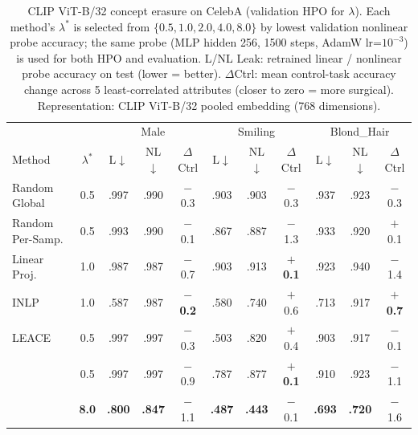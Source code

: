 \begin{table}[t]
\centering
\caption{CLIP ViT-B/32 concept erasure on CelebA (validation HPO for $\lambda$). Each method's $\lambda^*$ is selected from $\{0.5, 1.0, 2.0, 4.0, 8.0\}$ by lowest validation nonlinear probe accuracy; the same probe (MLP hidden 256, 1500 steps, AdamW lr=$10^{-3}$) is used for both HPO and evaluation. L/NL Leak: retrained linear / nonlinear probe accuracy on test (lower = better). $\Delta$Ctrl: mean control-task accuracy change across 5 least-correlated attributes (closer to zero = more surgical). Representation: CLIP ViT-B/32 pooled embedding (768 dimensions).}
\label{tab:celeba_clip_fair}
\small
\setlength{\tabcolsep}{3.5pt}
\begin{tabular}{l c|ccc|ccc|ccc}
\toprule
 & & \multicolumn{3}{c|}{Male} & \multicolumn{3}{c|}{Smiling} & \multicolumn{3}{c}{Blond\_Hair} \\
Method & $\lambda^*$ & L$\downarrow$ & NL$\downarrow$ & $\Delta$Ctrl & L$\downarrow$ & NL$\downarrow$ & $\Delta$Ctrl & L$\downarrow$ & NL$\downarrow$ & $\Delta$Ctrl \\
\midrule
Random Global & 0.5 & .997 & .990 & $-$0.3 & .903 & .903 & $-$0.3 & .937 & .923 & $-$0.3 \\
Random Per-Samp. & 0.5 & .993 & .990 & $-$0.1 & .867 & .887 & $-$1.3 & .933 & .920 & $+$0.1 \\
Linear Proj. & 1.0 & .987 & .987 & $-$0.7 & .903 & .913 & \textbf{$+$0.1} & .923 & .940 & $-$1.4 \\
INLP & 1.0 & .587 & .987 & \textbf{$-$0.2} & .580 & .740 & $+$0.6 & .713 & .917 & \textbf{$+$0.7} \\
LEACE & 0.5 & .997 & .997 & $-$0.3 & .503 & .820 & $+$0.4 & .903 & .917 & $-$0.1 \\
\AmbGCE{} & 0.5 & .997 & .997 & $-$0.9 & .787 & .877 & \textbf{$+$0.1} & .910 & .923 & $-$1.1 \\
\textbf{\TanGCE{}} & \textbf{8.0} & \textbf{.800} & \textbf{.847} & $-$1.1 & \textbf{.487} & \textbf{.443} & $-$0.1 & \textbf{.693} & \textbf{.720} & $-$1.6 \\
\bottomrule
\end{tabular}
\end{table}

